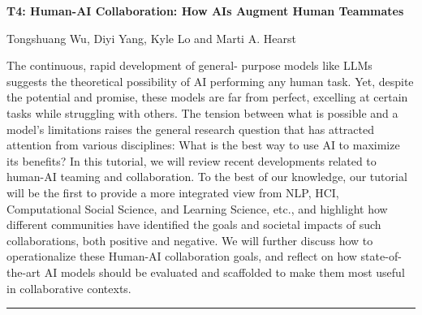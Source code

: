 \begin{center}
    \Large{\textbf{T4: Human-AI Collaboration: How AIs Augment Human Teammates}\\}
    \par\bigskip
    \large{Tongshuang Wu, Diyi Yang, Kyle Lo and Marti A. Hearst}\\
    \par\bigskip

\end{center}

The continuous, rapid development of general- purpose models like LLMs suggests the theoretical possibility of AI performing any human task. 
Yet, despite the potential and promise, these models are far from perfect, excelling at certain tasks while struggling with others. 
The tension between what is possible and a model's limitations raises the general research question that has attracted attention from various disciplines: What is the best way to use AI to maximize its benefits? In this tutorial, we will review recent developments related to human-AI teaming and collaboration. 
To the best of our knowledge, our tutorial will be the first to provide a more integrated view from NLP, HCI, Computational Social Science, and Learning Science, etc., and highlight how different communities have identified the goals and societal impacts of such collaborations, both positive and negative. We will further discuss how to operationalize these Human-AI collaboration goals, and reflect on how state-of-the-art AI models should be evaluated and scaffolded to make them most useful in collaborative contexts.
\begin{center}
    \noindent\rule{200px}{1pt}
\end{center}
